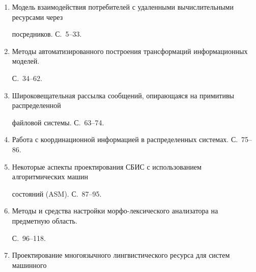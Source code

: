 \begin{enumerate}[1.]


\item {}


Модель взаимодействия потребителей с удаленными вы\-чис\-ли\-тель\-ны\-ми ресурсами через 


посредников. С.~5--33.


\item {}


Методы автоматизированного построения трансформаций информационных моделей. 


С.~34--62.


\item {}


Широковещательная рассылка сообщений, опирающаяся на примитивы распределенной 


файловой системы. С.~63--74.


\item {}


Работа с координационной информацией в распределенных системах. С.~75--86.


\item {}


Некоторые аспекты проектирования СБИС с использованием алгоритмических машин 


состояний (ASM). С.~87--95.





\item {}


Методы и средства настройки морфо-лексического анализатора на предметную область.  


С.~96--118.





\item {}


Проектирование многоязычного лингвистического ресурса для систем машинного 



\end{enumerate}
